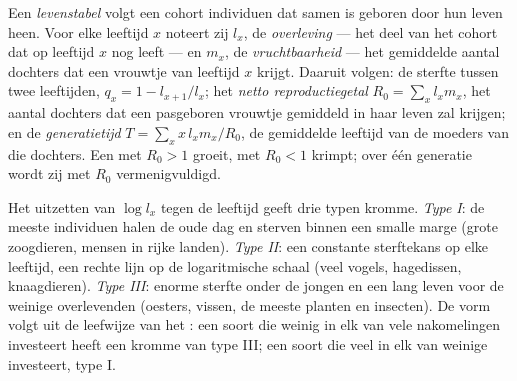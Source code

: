 \begin{definition}[Levenstabel]\label{def:b1:populations:lifetable}
Een \emph{levenstabel} volgt een cohort individuen dat samen is geboren
door hun leven heen. Voor elke leeftijd $x$ noteert zij $l_x$, de
\emph{overleving} --- het deel van het cohort dat op leeftijd $x$ nog leeft
--- en $m_x$, de \emph{vruchtbaarheid} --- het gemiddelde aantal dochters
dat een vrouwtje van leeftijd $x$ krijgt. Daaruit volgen: de sterfte tussen
twee leeftijden, $q_x = 1 - l_{x+1}/l_x$; het \emph{netto reproductiegetal}
$R_0 = \sum_x l_x m_x$, het aantal dochters dat een pasgeboren vrouwtje
gemiddeld in haar leven zal krijgen; en de \emph{generatietijd}
$T = \sum_x x\,l_x m_x / R_0$, de gemiddelde leeftijd van de moeders van
die dochters. Een  met $R_0 > 1$ groeit, met $R_0 < 1$ krimpt;
over één generatie wordt zij met $R_0$ vermenigvuldigd.
\end{definition}

\begin{proposition}\label{prop:b1:populations:survivorship}
Het uitzetten van $\log l_x$ tegen de leeftijd geeft drie typen kromme.
\emph{Type I}: de meeste individuen halen de oude dag en sterven binnen een
smalle marge (grote zoogdieren, mensen in rijke landen). \emph{Type II}:
een constante sterftekans op elke leeftijd, een rechte lijn op de
logaritmische schaal (veel vogels, hagedissen, knaagdieren). \emph{Type
III}: enorme sterfte onder de jongen en een lang leven voor de weinige
overlevenden (oesters, vissen, de meeste planten en insecten). De vorm
volgt uit de leefwijze van het : een soort die weinig in elk van
vele nakomelingen investeert heeft een kromme van type III; een soort die
veel in elk van weinige investeert, type I.
\end{proposition}


